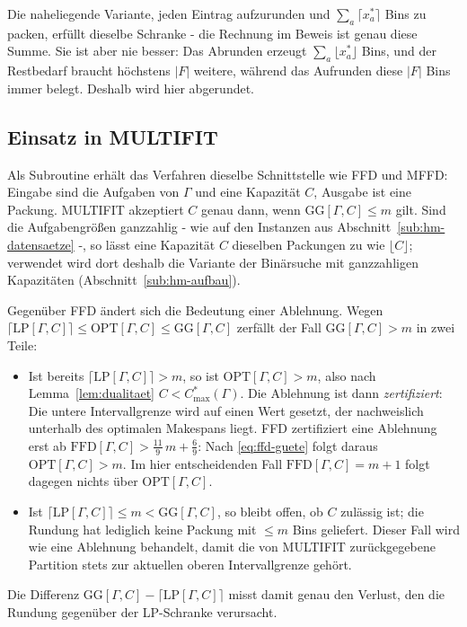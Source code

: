 \begin{bemerkung}
\label{bem:gg-aufrunden}
Die naheliegende Variante, jeden Eintrag aufzurunden und $\sum_a \lceil x^\ast_a \rceil$ Bins zu
packen, erfüllt dieselbe Schranke - die Rechnung im Beweis ist genau diese Summe.
Sie ist aber nie besser: Das Abrunden erzeugt $\sum_a \lfloor x^\ast_a \rfloor$ Bins, und der
Restbedarf braucht höchstens $|F|$ weitere, während das Aufrunden diese $|F|$ Bins immer belegt.
Deshalb wird hier abgerundet.
\end{bemerkung}

\subsection{Einsatz in MULTIFIT}
\label{sub:gg-multifit}

Als Subroutine erhält das Verfahren dieselbe Schnittstelle wie FFD und MFFD: Eingabe sind die
Aufgaben von $\Gamma$ und eine Kapazität $C$, Ausgabe ist eine Packung.
MULTIFIT akzeptiert $C$ genau dann, wenn $\mathrm{GG}[\Gamma, C] \le m$ gilt.
Sind die Aufgabengrößen ganzzahlig - wie auf den Instanzen aus Abschnitt~\ref{sub:hm-datensaetze} -,
so lässt eine Kapazität $C$ dieselben Packungen zu wie $\lfloor C \rfloor$; verwendet wird
dort deshalb die Variante der Binärsuche mit ganzzahligen Kapazitäten
(Abschnitt~\ref{sub:hm-aufbau}).

Gegenüber FFD ändert sich die Bedeutung einer Ablehnung.
Wegen $\lceil \mathrm{LP}[\Gamma, C] \rceil \le \mathrm{OPT}[\Gamma, C] \le \mathrm{GG}[\Gamma, C]$
zerfällt der Fall $\mathrm{GG}[\Gamma, C] > m$ in zwei Teile:
\begin{itemize}[leftmargin=*, itemsep=3pt]
  \item Ist bereits $\lceil \mathrm{LP}[\Gamma, C] \rceil > m$, so ist
    $\mathrm{OPT}[\Gamma, C] > m$, also nach Lemma~\ref{lem:dualitaet} $C < C^{*}_{\max}(\Gamma)$.
    Die Ablehnung ist dann \emph{zertifiziert}: Die untere Intervallgrenze wird auf einen Wert
    gesetzt, der nachweislich unterhalb des optimalen Makespans liegt.
    FFD zertifiziert eine Ablehnung erst ab $\mathrm{FFD}[\Gamma, C] > \tfrac{11}{9}\,m + \tfrac{6}{9}$:
    Nach \eqref{eq:ffd-guete} folgt daraus $\mathrm{OPT}[\Gamma, C] > m$.
    Im hier entscheidenden Fall $\mathrm{FFD}[\Gamma, C] = m+1$ folgt dagegen nichts
    über $\mathrm{OPT}[\Gamma, C]$.
  \item Ist $\lceil \mathrm{LP}[\Gamma, C] \rceil \le m < \mathrm{GG}[\Gamma, C]$, so bleibt offen,
    ob $C$ zulässig ist; die Rundung hat lediglich keine Packung mit $\le m$ Bins geliefert.
    Dieser Fall wird wie eine Ablehnung behandelt, damit die von MULTIFIT zurückgegebene Partition
    stets zur aktuellen oberen Intervallgrenze gehört.
\end{itemize}
Die Differenz $\mathrm{GG}[\Gamma, C] - \lceil \mathrm{LP}[\Gamma, C] \rceil$ misst damit genau
den Verlust, den die Rundung gegenüber der LP-Schranke verursacht.

